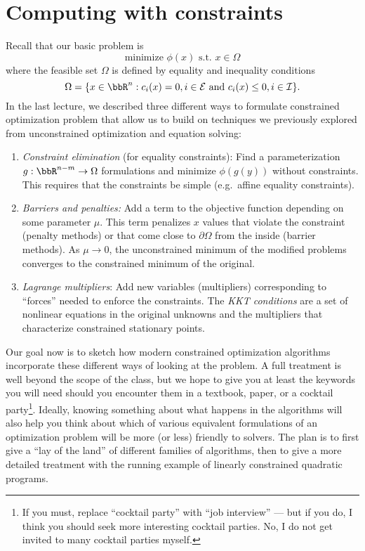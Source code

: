 \documentclass[12pt, leqno]{article} %
\begin{document}

\section{Computing with constraints}

Recall that our basic problem is
\[
\mbox{minimize } \phi(x) \mbox{ s.t. } x \in \Omega
\]
where the feasible set $\Omega$ is defined by equality and inequality
conditions
\[
  \Omega = \{ x \in \bbR^n : c_i(x) = 0, i \in \mathcal{E} \mbox{ and }
    c_i(x) \leq 0, i \in \mathcal{I} \}.
\]
In the last lecture, we described three different ways to formulate
constrained optimization problem that allow us to build on techniques
we previously explored from unconstrained optimization and equation
solving:
\begin{enumerate}
\item {\em Constraint elimination} (for equality constraints):
  Find a parameterization $g : \bbR^{n-m} \rightarrow \Omega$
  formulations and minimize $\phi(g(y))$ without constraints.
  This requires that the constraints be simple (e.g.~affine equality
  constraints).
\item {\em Barriers and penalties:} Add a term to the objective
  function depending on some parameter $\mu$.  This term penalizes $x$
  values that violate the constraint (penalty methods) or that come
  close to $\partial \Omega$ from the inside (barrier methods).  As
  $\mu \rightarrow 0$, the unconstrained minimum of the modified
  problems converges to the constrained minimum of the original.
\item {\em Lagrange multipliers}: Add new variables (multipliers)
  corresponding to ``forces'' needed to enforce the constraints.
  The {\em KKT conditions} are a set of nonlinear equations in the
  original unknowns and the multipliers that characterize constrained
  stationary points.
\end{enumerate}
Our goal now is to sketch how modern constrained optimization
algorithms incorporate these different ways of looking at the problem.
A full treatment is well beyond the scope of the class, but we hope
to give you at least the keywords you will need should you encounter
them in a textbook, paper, or a cocktail party\footnote{If you must,
  replace ``cocktail party'' with ``job interview'' --- but if you do,
  I think you should seek more interesting cocktail parties.  No, I do
  not get invited to many cocktail parties myself.}.
Ideally, knowing something about what happens in the algorithms will
also help you think about which of various equivalent formulations
of an optimization problem will be more (or less) friendly to solvers.
The plan is to first give a ``lay of the land'' of different families
of algorithms, then to give a more detailed treatment with the running
example of linearly constrained quadratic programs.
\end{document}
